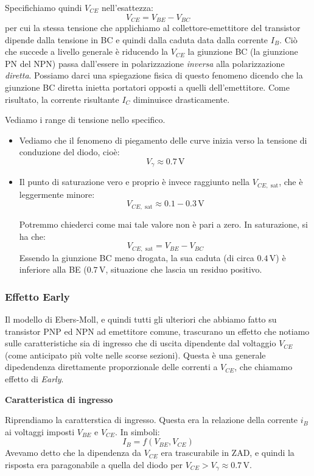 \documentclass[a4paper,11pt]{article}
\begin{document}
Specifichiamo quindi $V_{CE}$ nell'esattezza:
$$
V_{CE} = V_{BE} - V_{BC}
$$
per cui la stessa tensione che applichiamo al collettore-emettitore del transistor dipende dalla tensione in BC e quindi dalla caduta data dalla corrente $I_B$. Ciò che succede a livello generale è riducendo la $V_{CE}$ la giunzione BC (la giunzione PN del NPN) passa dall'essere in polarizzazione \textit{inversa} alla polarizzazione \textit{diretta}. Possiamo darci una spiegazione fisica di questo fenomeno dicendo che la giunzione BC diretta inietta portatori opposti a quelli dell’emettitore. Come risultato, la corrente risultante $I_C$ diminuisce drasticamente.

Vediamo i range di tensione nello specifico.
\begin{itemize}
	\item Vediamo che il fenomeno di piegamento delle curve inizia verso la tensione di conduzione del diodo, cioè:
$$
V_\gamma \approx 0.7 \, \mathrm{V}
$$
\item Il punto di saturazione vero e proprio è invece raggiunto nella $V_{CE, \text{ sat}}$, che è leggermente minore:
$$
V_{CE, \text{ sat}} \approx 0.1 - 0.3 \, \mathrm{V}
$$

Potremmo chiederci come mai tale valore non è pari a zero. In saturazione, si ha che:
$$
V_{CE, \text{ sat}} = V_{BE} - V_{BC}
$$
Essendo la giunzione BC meno drogata, la sua caduta (di circa $0.4 \, \mathrm{V}$) è inferiore alla BE ($0.7 \, \mathrm{V}$, situazione che lascia un residuo positivo.
\end{itemize}

\subsubsection{Effetto Early}
Il modello di Ebers-Moll, e quindi tutti gli ulteriori che abbiamo fatto su transistor PNP ed NPN ad emettitore comune, trascurano un effetto che notiamo sulle caratteristiche sia di ingresso che di uscita dipendente dal voltaggio $V_{CE}$ (come anticipato più volte nelle scorse sezioni). Questa è una generale dipedendenza direttamente proporzionale delle correnti a $V_{CE}$, che chiamamo effetto di \textit{Early}.

\par\smallskip

\noindent
\textbf{\textsf{Caratteristica di ingresso}}

\noindent
Riprendiamo la caratterstica di ingresso. Questa era la relazione della corrente $i_B$ ai voltaggi imposti $V_{BE}$ e $V_{CE}$. In simboli:
$$
I_B = f(V_{BE}, V_{CE})
$$
Avevamo detto che la dipendenza da $V_{CE}$ era trascurabile in ZAD, e quindi la risposta era paragonabile a quella del diodo per $V_{CE} > V_\gamma \approx 0.7 \, \mathrm{V}$. 
\end{document}
